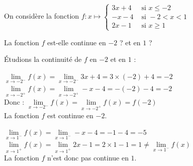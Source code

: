 \documentclass[11pt,a4paper]{article}  %
\begin{document}
	\graphicspath{{images/}}

	\begin{center}

	\end{center}


On considère la fonction $f: x \mapsto \begin{cases}3 x+4 & \text { si } x \leqslant-2 \\ -x-4 & \text { si }-2<x<1  \\ 2x-1 & \text { si } x \geqslant 1\end{cases}$

La fonction $f$ est-elle continue en $-2$ ? et en $1$ ?

\begin{corrBox}
	Étudions la continuité de \(f\) en $-2$ et en $1$ :

	\begin{itemMet}
		\item \(\lim \limits_{x \rightarrow -2^{-}} f(x)=\lim \limits_{x \rightarrow -2^{-}}3x+4=3\times (-2)+4=-2\)\\
		\(\lim \limits_{x \rightarrow -2^{+}} f(x)=\lim \limits_{x \rightarrow -2^{+}} -x-4=-(-2)-4=-2\)\\
		Donc : \(\lim \limits_{x \rightarrow -2^{-}} f(x)=\lim \limits_{x \rightarrow -2^{+}} f(x)=f(-2)\)\\
		La fonction \(f\) est continue en $-2$.
		\item \(\lim \limits_{x \rightarrow 1^{-}} f(x)=\lim \limits_{x \rightarrow 1^{-}} -x-4=-1-4=-5\)\\
		\(\lim \limits_{x \rightarrow 1^{+}} f(x)=\lim \limits_{x \rightarrow 1^{+}}2x-1=2 \times 1-1=1\neq\lim \limits_{x \rightarrow 1^{-}} f(x)\)\\
		La fonction \(f\) n'est donc pas continue en $1$.\\
	\end{itemMet}
\end{corrBox}

\end{document}
